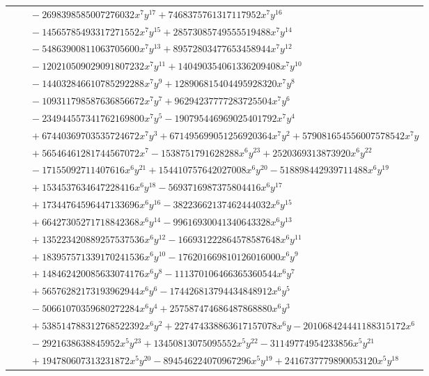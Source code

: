\documentclass[11pt]{article}
\begin{document}
\begin{longtable}{@{}ll@{}}
 & $\quad -2698398585007276032x^{7}y^{17}+7468375761317117952x^{7}y^{16}$\\
 & $\quad -14565785493317271552x^{7}y^{15}+28573085749555519488x^{7}y^{14}$\\
 & $\quad -54863900811063705600x^{7}y^{13}+89572803477653458944x^{7}y^{12}$\\
 & $\quad -120210509029091807232x^{7}y^{11}+140490354061336209408x^{7}y^{10}$\\
 & $\quad -144032846610785292288x^{7}y^{9}+128906815404495928320x^{7}y^{8}$\\
 & $\quad -109311798587636856672x^{7}y^{7}+96294237777283725504x^{7}y^{6}$\\
 & $\quad -234944557341762169800x^{7}y^{5}-190795446969025401792x^{7}y^{4}$\\
 & $\quad +67440369703535724672x^{7}y^{3}+671495699051256920364x^{7}y^{2}+579081654556007578542x^{7}y$\\
 & $\quad +56546461281744567072x^{7}-1538751791628288x^{6}y^{23}+2520369313873920x^{6}y^{22}$\\
 & $\quad -17155092711407616x^{6}y^{21}+154410757642027008x^{6}y^{20}-518898442939711488x^{6}y^{19}$\\
 & $\quad +1534537634647228416x^{6}y^{18}-5693716987375804416x^{6}y^{17}$\\
 & $\quad +17344764596447133696x^{6}y^{16}-38223662137462444032x^{6}y^{15}$\\
 & $\quad +66427305271718842368x^{6}y^{14}-99616930041340643328x^{6}y^{13}$\\
 & $\quad +135223420889257537536x^{6}y^{12}-166931222864578587648x^{6}y^{11}$\\
 & $\quad +183957571339170241536x^{6}y^{10}-176201669810126016000x^{6}y^{9}$\\
 & $\quad +148462420085633074176x^{6}y^{8}-111370106466365360544x^{6}y^{7}$\\
 & $\quad +56576282173193962944x^{6}y^{6}-174426813794434848912x^{6}y^{5}$\\
 & $\quad -50661070359680272284x^{6}y^{4}+257587474686487868880x^{6}y^{3}$\\
 & $\quad +538514788312768522392x^{6}y^{2}+227474338863617157078x^{6}y-201068424441188315172x^{6}$\\
 & $\quad -2921638638845952x^{5}y^{23}+13450813075095552x^{5}y^{22}-31149774954233856x^{5}y^{21}$\\
 & $\quad +194780607313231872x^{5}y^{20}-894546224070967296x^{5}y^{19}+2416737779890053120x^{5}y^{18}$\\

\end{longtable}
\end{document}

